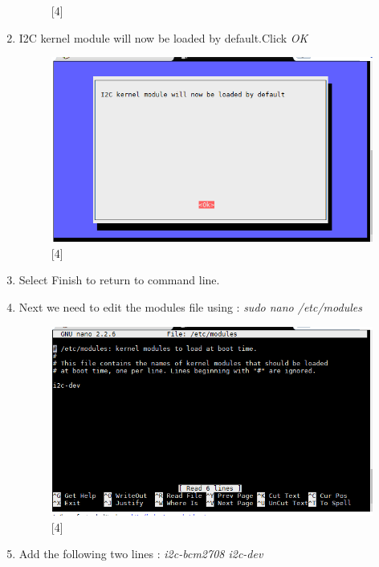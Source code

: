 \documentclass[11pt,a4paper]{article}
\begin{document}
\begin{enumerate}
\begin{figure}[h!]
			\centering
			\caption{[4]}
		\end{figure}
		\item I2C kernel module will now be loaded by default.Click \textit{OK}
		\begin{figure}[h!]
			\includegraphics[scale=0.6]{i2c_6.png}
			\centering
			\caption{[4]}
		\end{figure}
		\item Select Finish to return to command line.
		\item Next we need to edit the modules file using : \newline \textit{sudo nano /etc/modules} 
		\begin{figure}[h!]
			\includegraphics[scale=0.6]{i2c_7.png}
			\centering
			\caption{[4]}
		\end{figure}
		\newpage
		\item Add the following two lines : \newline \textit{i2c-bcm2708 \newline i2c-dev}
		

\end{enumerate}
\end{document}
